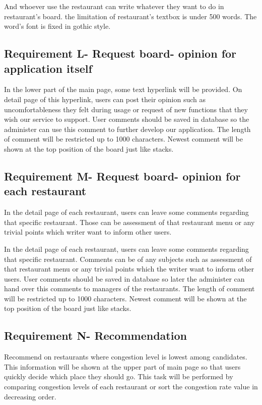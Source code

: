 \documentclass[journal]{IEEEtran}
\begin{document}
 And whoever use the restaurant can write whatever they want to do in restaurant’s board. the limitation of restaurant’s textbox is under 500 words. The word’s font is fixed in gothic style. 

\subsection{Requirement L- Request board- opinion for application itself}
In the lower part of the main page, some text hyperlink will be provided. On detail page of this hyperlink, users can post their opinion such as uncomfortableness they felt during usage or request of new functions that they wish our service to support. 
User comments should be saved in database so the administer can use this comment to further develop our application. The length of comment will be restricted up to 1000 characters. Newest comment will be shown at the top position of the board just like stacks.

\subsection{Requirement M- Request board- opinion for each restaurant}
In the detail page of each restaurant, users can leave some comments regarding that specific restaurant. Those can be assessment of that restaurant menu or any trivial points which writer want to inform other users.  


In the detail page of each restaurant, users can leave some comments regarding that specific restaurant. Comments can be of any subjects such as assessment of that restaurant menu or any trivial points which the writer want to inform other users. User comments should be saved in database so later the administer can hand over this comments to managers of the restaurants. The length of comment will be restricted up to 1000 characters. Newest comment will be shown at the top position of the board just like stacks.

\subsection{Requirement N- Recommendation}
Recommend on restaurants where congestion level is lowest among candidates. This information will be shown at the upper part of main page so that users quickly decide which place they should go. This task will be performed by comparing congestion levels of each restaurant or sort the congestion rate value in decreasing order. 
\end{document}
